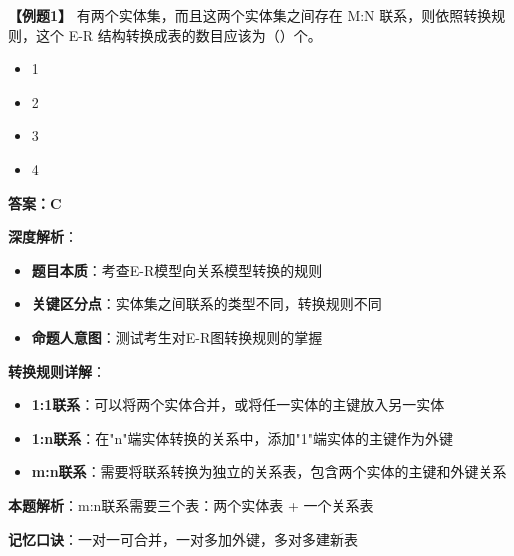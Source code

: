 \documentclass[12pt, a4paper]{article}
\newenvironment{bluebox}[1]{%
  \begin{trivlist}
  \item[\hskip\labelsep \textbf{#1}]
  \setlength{\parskip}{0.5ex}
  \setlength{\itemsep}{0.5ex}
}{%
  \end{trivlist}
}
\begin{document}
\begin{bluebox}{例题1：E-R图转关系模型}
	\textbf{【例题1】} 有两个实体集，而且这两个实体集之间存在 M:N 联系，则依照转换规则，这个 E-R 结构转换成表的数目应该为（\quad）个。

	\begin{itemize}
		\item[A)] 1
		\item[B)] 2
		\item[C)] 3
		\item[D)] 4
	\end{itemize}

	\textbf{答案：C}

	\textbf{深度解析}：

	\begin{itemize}
		\item \textbf{题目本质}：考查E-R模型向关系模型转换的规则
		\item \textbf{关键区分点}：实体集之间联系的类型不同，转换规则不同
		\item \textbf{命题人意图}：测试考生对E-R图转换规则的掌握
	\end{itemize}

	\textbf{转换规则详解}：

	\begin{itemize}
		\item \textbf{1:1联系}：可以将两个实体合并，或将任一实体的主键放入另一实体
		\item \textbf{1:n联系}：在"n"端实体转换的关系中，添加"1"端实体的主键作为外键
		\item \textbf{m:n联系}：需要将联系转换为独立的关系表，包含两个实体的主键和外键关系
	\end{itemize}

	\textbf{本题解析}：m:n联系需要三个表：两个实体表 + 一个关系表

	\textbf{记忆口诀}：一对一可合并，一对多加外键，多对多建新表
\end{bluebox}
\end{document}
